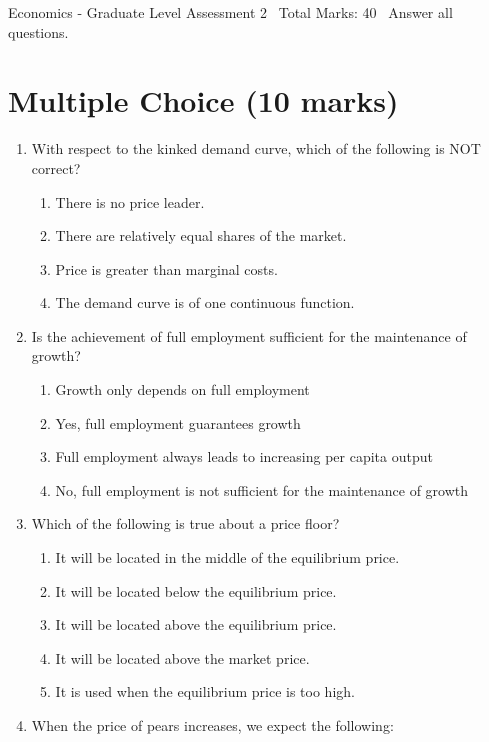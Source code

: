 \documentclass[12pt]{article}
\begin{document}
\begin{center}
Economics - Graduate Level Assessment 2 \
Total Marks: 40 \
Answer all questions.
\end{center}

\section*{Multiple Choice (10 marks)}
\begin{enumerate}[label=\arabic*.]
\item With respect to the kinked demand curve, which of the following is NOT correct?
\begin{enumerate}[label=(\alph*)]
    \item There is no price leader.
    \item There are relatively equal shares of the market.
    \item Price is greater than marginal costs.
    \item The demand curve is of one continuous function.
\end{enumerate}
\item Is the achievement of full employment sufficient for the maintenance of growth?
\begin{enumerate}[label=(\alph*)]
    \item Growth only depends on full employment
    \item Yes, full employment guarantees growth
    \item Full employment always leads to increasing per capita output
    \item No, full employment is not sufficient for the maintenance of growth
\end{enumerate}
\item Which of the following is true about a price floor?
\begin{enumerate}[label=(\alph*)]
    \item It will be located in the middle of the equilibrium price.
    \item It will be located below the equilibrium price.
    \item It will be located above the equilibrium price.
    \item It will be located above the market price.
    \item It is used when the equilibrium price is too high.
\end{enumerate}
\item When the price of pears increases, we expect the following:

\end{enumerate}
\end{document}
